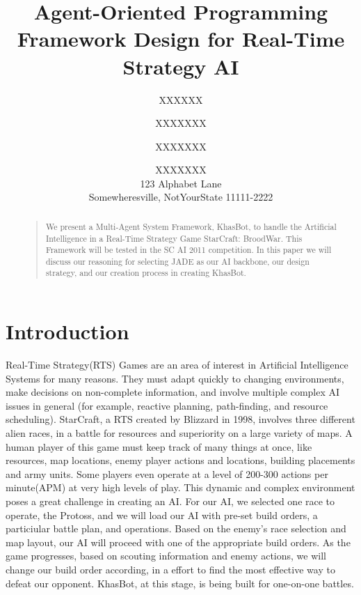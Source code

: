 \documentclass[letterpaper]{article}
\begin{document}
%
\title{Agent-Oriented Programming Framework Design for Real-Time Strategy AI}


\author{XXXXXX \and XXXXXXX \and XXXXXXX \and XXXXXXX \\
123 Alphabet Lane \\  Somewheresville, NotYourState 11111-2222
}

\maketitle
\begin{abstract}
\begin{quote}
We present a Multi-Agent System Framework, KhasBot, to handle the Artificial Intelligence in a Real-Time Strategy Game StarCraft: BroodWar.  This Framework will be tested in the SC AI 2011 competition.  In this paper we will discuss our reasoning for selecting JADE as our AI backbone, our design strategy, and our creation process in creating KhasBot.
\end{quote}
\end{abstract}

\section{Introduction}
Real-Time Strategy(RTS) Games are an area of interest in Artificial Intelligence Systems for many reasons.  They must adapt quickly to changing environments, make decisions on non-complete information, and involve multiple complex AI issues in general (for example, reactive planning, path-finding, and resource scheduling).  StarCraft, a RTS created by Blizzard in 1998, involves three different alien races, in a battle for resources and superiority on a large variety of maps.  A human player of this game must keep track of many things at once, like resources, map locations, enemy player actions and locations, building placements and army units.  Some players even operate at a level of 200-300 actions per minute(APM) at very high levels of play.  This dynamic and complex environment poses a great challenge in creating an AI.  For our AI, we selected one race to operate, the Protoss, and we will load our AI with pre-set build orders, a particiular battle plan, and operations.  Based on the enemy's race selection and map layout, our AI will proceed with one of the appropriate build orders.  As the game progresses, based on scouting information and enemy actions, we will change our build order according, in a effort to find the most effective way to defeat our opponent.  KhasBot, at this stage, is being built for one-on-one battles.
\end{document}
